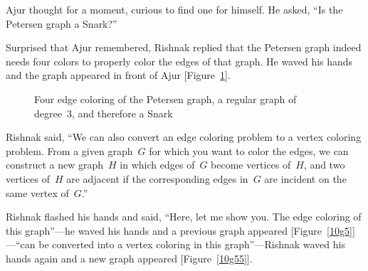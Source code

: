 Ajur thought for a moment, curious to find one for himself. He asked, ``Is the Petersen graph a Snark?'' 

Surprised that Ajur remembered, Rishnak replied that the Petersen graph indeed needs four colors to properly color the edges of that graph. He waved his hands and the graph appeared in front of Ajur [Figure~\ref{10g7}].

\begin{figure}
\begin{center}
\caption{Four edge coloring of the Petersen graph, a regular graph of degree~3, and therefore a Snark}\label{10g7}
\end{center}
\end{figure}

Rishnak said, ``We can also convert an edge coloring problem to a vertex coloring problem. From a given graph~$G$ for which you want to color the edges, we can construct a new graph~$H$ in which edges of~$G$ become vertices of~$H$, and two vertices of~$H$ are adjacent if the corresponding edges in~$G$ are incident on the same vertex of~$G$.''

Rishnak flashed his hands and said, ``Here, let me show you.  The edge coloring of this graph''---he waved his hands and a previous graph appeared [Figure~\ref{10g5}]---``can be converted into a vertex coloring in this graph''---Rishnak waved his hands again and a new graph appeared [Figure~\ref{10g55}].

